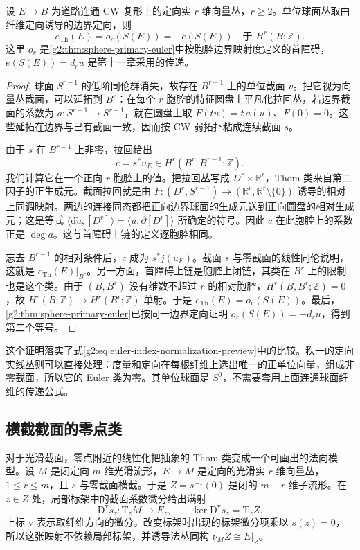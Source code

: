 \begin{theorem}\label{g2:thm:euler-primary-comparison}
	设 \(E\to B\) 为道路连通 CW 复形上的定向实 \(r\) 维向量丛，\(r\ge2\)。单位球面丛取由纤维定向诱导的边界定向，则
	\begin{equation}\label{g2:eq:euler-primary-comparison}
		e_{\mathrm{Th}}(E)=o_r(S(E))=-e(S(E))\quad\text{于 }H^r(B;\mathbb Z).
	\end{equation}
	这里 \(o_r\) 是\cref{g2:thm:sphere-primary-euler}中按胞腔边界映射度定义的首障碍，\(e(S(E))=d_ru\) 是第十一章采用的传递。
\end{theorem}
\begin{proof}
	球面 \(S^{r-1}\) 的低阶同伦群消失，故存在 \(B^{r-1}\) 上的单位截面 \(v\)。把它视为向量丛截面，可以延拓到 \(B^r\)：在每个 \(r\) 胞腔的特征圆盘上平凡化拉回丛，若边界截面的系数为 \(a:S^{r-1}\to S^{r-1}\)，就在圆盘上取 \(F(tu)=t\,a(u)\)、\(F(0)=0\)。这些延拓在边界与已有截面一致，因而按 CW 弱拓扑粘成连续截面 \(s\)。

	由于 \(s\) 在 \(B^{r-1}\) 上非零，拉回给出
	\[
		c=s^*u_E\in H^r(B^r,B^{r-1};\mathbb Z).
	\]
	我们计算它在一个正向 \(r\) 胞腔上的值。把拉回丛写成 \(D^r\times\mathbb R^r\)，Thom 类来自第二因子的正生成元。截面拉回就是由 \(F:(D^r,S^{r-1})\to(\mathbb R^r,\mathbb R^r\setminus\{0\})\) 诱导的相对上同调映射。两边的连接同态都把正向边界球面的生成元送到正向圆盘的相对生成元；这是等式 \(\langle\mathrm d\widetilde u,[D^r]\rangle=\langle u,\partial[D^r]\rangle\) 所确定的符号。因此 \(c\) 在此胞腔上的系数正是 \(\deg a\)。这与首障碍上链的定义逐胞腔相同。

	忘去 \(B^{r-1}\) 的相对条件后，\(c\) 成为 \(s^*j(u_E)\)。截面 \(s\) 与零截面的线性同伦说明，这就是 \(e_{\mathrm{Th}}(E)|_{B^r}\)。另一方面，首障碍上链是胞腔上闭链，其类在 \(B^r\) 上的限制也是这个类。由于 \((B,B^r)\) 没有维数不超过 \(r\) 的相对胞腔，\(H^r(B,B^r;\mathbb Z)=0\)，故 \(H^r(B;\mathbb Z)\to H^r(B^r;\mathbb Z)\) 单射。于是 \(e_{\mathrm{Th}}(E)=o_r(S(E))\)。最后，\cref{g2:thm:sphere-primary-euler}已按同一边界定向证明 \(o_r(S(E))=-d_ru\)，得到第二个等号。
\end{proof}

这个证明落实了式\eqref{g2:eq:euler-index-normalization-preview}中的比较。秩一的定向实线丛则可以直接处理：度量和定向在每根纤维上选出唯一的正单位向量，组成非零截面，所以它的 Euler 类为零。其单位球面是 \(S^0\)，不需要套用上面连通球面纤维的传递公式。

\subsection{横截截面的零点类}
\label{g2:subsec:2003:02}
对于光滑截面，零点附近的线性化把抽象的 Thom 类变成一个可画出的法向模型。设 \(M\) 是闭定向 \(m\) 维光滑流形，\(E\to M\) 是定向的光滑实 \(r\) 维向量丛，\(1\le r\le m\)，且 \(s\) 与零截面横截。于是 \(Z=s^{-1}(0)\) 是闭的 \(m-r\) 维子流形。在 \(z\in Z\) 处，局部标架中的截面系数微分给出满射
\[
	\mathrm D^{\mathrm v}s_z:\mathrm T_zM\longrightarrow E_z,
	\qquad\ker\mathrm D^{\mathrm v}s_z=\mathrm T_zZ.
\]
上标 \(\mathrm v\) 表示取纤维方向的微分。改变标架时出现的标架微分项乘以 \(s(z)=0\)，所以这张映射不依赖局部标架，并诱导法丛同构 \(\nu_MZ\cong E|_Z\)。

